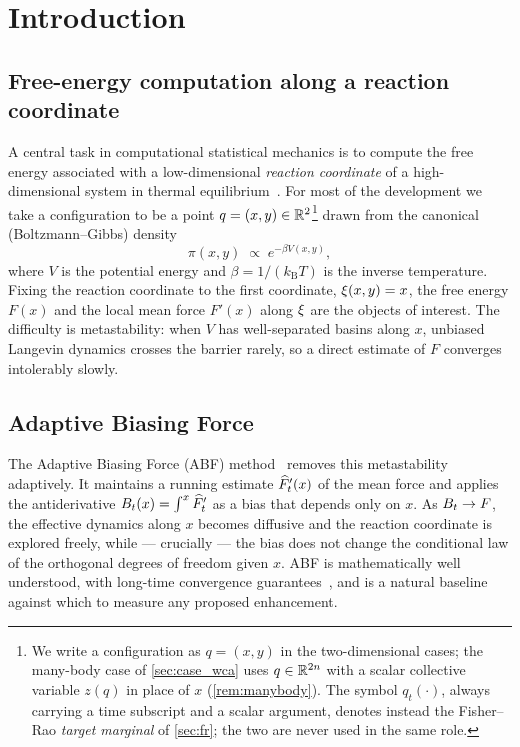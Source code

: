 \section{Introduction}
\label{sec:intro}

\subsection{Free-energy computation along a reaction coordinate}
A central task in computational statistical mechanics is to compute the free
energy associated with a low-dimensional \emph{reaction coordinate} of a
high-dimensional system in thermal equilibrium~\citep{LelievreRoussetStoltz2010}.
For most of the development we take a configuration to be a point
$q=(x,y)\in\mathbb{R}^2$\footnote{We write a configuration as $q=(x,y)$ in the
two-dimensional cases; the many-body case of \cref{sec:case_wca} uses
$q\in\mathbb{R}^{2n}$ with a scalar collective variable $z(q)$ in place of $x$
(\cref{rem:manybody}). The symbol $q_t(\cdot)$, always carrying a time subscript
and a scalar argument, denotes instead the Fisher--Rao \emph{target marginal} of
\cref{sec:fr}; the two are never used in the same role.} drawn from the
canonical (Boltzmann--Gibbs) density
\begin{equation}
  \pi(x,y) \;\propto\; e^{-\beta V(x,y)},
  \label{eq:canonical}
\end{equation}
where $V$ is the potential energy and $\beta=1/(k_{\mathrm B}T)$ is the inverse
temperature. Fixing the reaction coordinate to the first coordinate,
$\xi(x,y)=x$, the free energy $F(x)$ and the local mean force $F'(x)$ along
$\xi$ are the objects of interest. The difficulty is metastability: when $V$
has well-separated basins along $x$, unbiased Langevin dynamics crosses the
barrier rarely, so a direct estimate of $F$ converges intolerably slowly.

\subsection{Adaptive Biasing Force}
The Adaptive Biasing Force (ABF) method~\citep{DarvePohorille2001,Henin2004,
Comer2015} removes this metastability adaptively. It maintains a running
estimate $\widehat{F}'_t(x)$ of the mean force and applies the antiderivative
$B_t(x)=\int^x\widehat{F}'_t$ as a bias that depends only on $x$. As
$B_t\to F$, the effective dynamics along $x$ becomes diffusive and the
reaction coordinate is explored freely, while --- crucially --- the bias does
not change the conditional law of the orthogonal degrees of freedom given $x$.
ABF is mathematically well understood, with long-time convergence
guarantees~\citep{LelievreRoussetStoltz2008}, and is a natural baseline against
which to measure any proposed enhancement.

